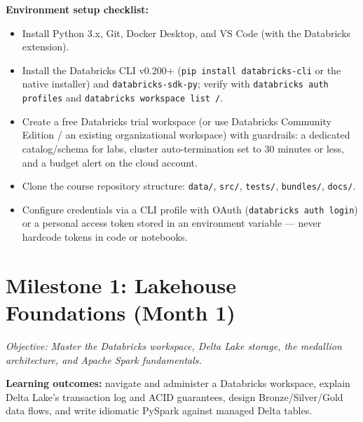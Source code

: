 \documentclass[11pt, a4paper]{article}
\begin{document}
\noindent\textbf{Environment setup checklist:}
\begin{itemize}[label=-]
    \item Install Python 3.x, Git, Docker Desktop, and VS Code (with the Databricks extension).
    \item Install the Databricks CLI v0.200+ (\texttt{pip install databricks-cli} or the native installer) and \texttt{databricks-sdk-py}; verify with \texttt{databricks auth profiles} and \texttt{databricks workspace list /}.
    \item Create a free Databricks trial workspace (or use Databricks Community Edition / an existing organizational workspace) with guardrails: a dedicated catalog/schema for labs, cluster auto-termination set to 30 minutes or less, and a budget alert on the cloud account.
    \item Clone the course repository structure: \texttt{data/}, \texttt{src/}, \texttt{tests/}, \texttt{bundles/}, \texttt{docs/}.
    \item Configure credentials via a CLI profile with OAuth (\texttt{databricks auth login}) or a personal access token stored in an environment variable --- never hardcode tokens in code or notebooks.
\end{itemize}

\section{Milestone 1: Lakehouse Foundations (Month 1)}
\textit{Objective: Master the Databricks workspace, Delta Lake storage, the medallion architecture, and Apache Spark fundamentals.}
\par\noindent\textbf{Learning outcomes:} navigate and administer a Databricks workspace, explain Delta Lake's transaction log and ACID guarantees, design Bronze/Silver/Gold data flows, and write idiomatic PySpark against managed Delta tables.
\end{document}
